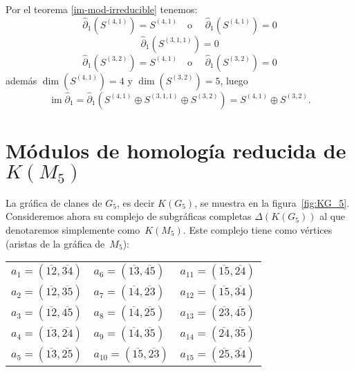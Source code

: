 \documentclass[12pt]{book}
\theoremstyle{definition}
\DeclareMathOperator{\im}{im}
\newcounter{in}
\begin{document}
Por el teorema \ref{im-mod-irreducible} tenemos:
  $$\widehat\partial_{1}(S^{(4,1)})=S^{(4,1)} \quad \mbox{o }\quad \widehat\partial_{1}(S^{(4,1)})=0$$
  $$\widehat\partial_{1}(S^{(3,1,1)})=0$$
  $$\widehat\partial_{1}(S^{(3,2)})=S^{(4,1)} \quad \mbox{o }\quad \widehat\partial_{1}(S^{(3,2)})=0$$
además $\dim(S^{(4,1)})=4$ y $\dim(S^{(3,2)})=5$, luego
$$\im\widehat\partial_{1}=\widehat\partial_{1}(S^{(4,1)}\oplus S^{(3,1,1)}\oplus S^{(3,2)})=S^{(4,1)}\oplus S^{(3,2)}.$$

\section{Módulos de homología reducida de $K(M_{5})$}
\label{hom-red-KM5}

La gráfica de clanes de $G_{5}$, es decir $K(G_{5})$, se muestra en la figura~\ref{fig:KG_5}.
Consideremos ahora su complejo de subgráficas completas $\Delta(K(G_{5}))$
al que denotaremos simplemente como~$K(M_{5})$. Este complejo tiene como
vértices (aristas de la gráfica de~$M_{5}$):
\begin{center}
  \begin{tabular}[h]{lll}
    $a_{1}=(\overline{12},\overline{34})$ & $a_{6}=(\overline{13},\overline{45})$ & $a_{11}=(\overline{15},\overline{24})$  \\
    $a_{2}=(\overline{12},\overline{35})$ & $a_{7}=(\overline{14},\overline{23})$ & $a_{12}=(\overline{15},\overline{34})$  \\
    $a_{3}=(\overline{12},\overline{45})$ & $a_{8}=(\overline{14},\overline{25})$ & $a_{13}=(\overline{23},\overline{45})$  \\
    $a_{4}=(\overline{13},\overline{24})$ & $a_{9}=(\overline{14},\overline{35})$ & $a_{14}=(\overline{24},\overline{35})$  \\
    $a_{5}=(\overline{13},\overline{25})$ & $a_{10}=(\overline{15},\overline{23})$ & $a_{15}=(\overline{25},\overline{34})$  
  \end{tabular}
\end{center}
\end{document}

